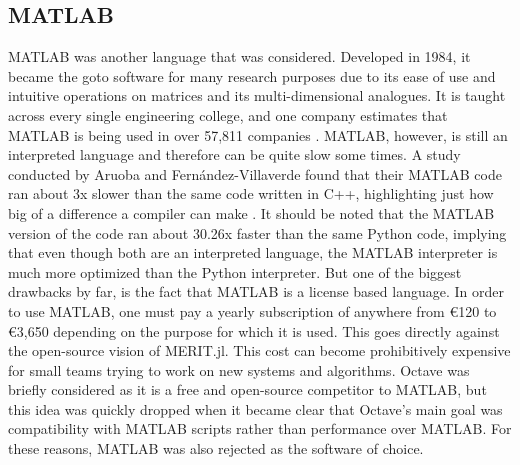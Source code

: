 \subsection{MATLAB}
MATLAB was another language that was considered. Developed in 1984, it became the goto software for many research
purposes due to its ease of use and intuitive operations on matrices and its multi-dimensional analogues. It is taught
across every single engineering college, and one company estimates that MATLAB is being used in over 57,811 companies
\cite{CompaniesUsingMATLAB}. MATLAB, however, is still an interpreted language and therefore can be quite slow some
times. A study conducted by Aruoba and Fernández-Villaverde found that their MATLAB code ran about 3x slower than the
same code written in C++, highlighting just how big of a difference a compiler can make \cite{aruobaComparisonProgrammingLanguages2018}. It should be noted that the
MATLAB version of the code ran about 30.26x faster than the same Python code, implying that even though both are an
interpreted language, the MATLAB interpreter is much more optimized than the Python interpreter. But one of the biggest
drawbacks by far, is the fact that MATLAB is a license based language. In order to use MATLAB, one must pay a yearly
subscription of anywhere from €120 to €3,650 depending on the purpose for which it is used. This goes directly against
the open-source vision of MERIT.jl. This cost can become prohibitively expensive for small teams trying to work on new
systems and algorithms. Octave was briefly considered as it is a free and open-source competitor to MATLAB, but this
idea was quickly dropped when it became clear that Octave's main goal was compatibility with MATLAB scripts rather than
performance over MATLAB. For these reasons, MATLAB was also rejected as the software of choice.


